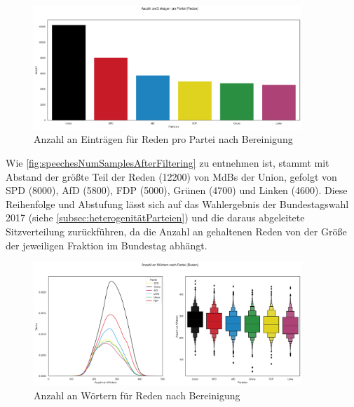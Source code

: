 \begin{figure}[H]
    \centering
    \includegraphics[width=0.9\textwidth]{data/images/speeches_num_samples_after_filter.png}
    \caption{Anzahl an Einträgen für Reden pro Partei nach Bereinigung} \label{fig:speechesNumSamplesAfterFiltering}
\end{figure}

Wie \autoref{fig:speechesNumSamplesAfterFiltering} zu entnehmen ist, stammt mit Abstand der größte Teil der Reden (\num{12200}) von \acp{MdB} der Union, gefolgt von \ac{SPD} (\num{8000}), \ac{AfD} (\num{5800}), \ac{FDP} (\num{5000}), Grünen (\num{4700}) und Linken (\num{4600}). Diese Reihenfolge und Abstufung lässt sich auf das Wahlergebnis der Bundestagswahl \num{2017} (siehe \autoref{subsec:heterogenitätParteien}) und die daraus abgeleitete Sitzverteilung zurückführen, da die Anzahl an gehaltenen Reden von der Größe der jeweiligen Fraktion im Bundestag abhängt.

\begin{figure}[H]
    \centering
    \includegraphics[width=0.9\textwidth]{data/images/speeches_word_count_after_filter.png}
    \caption{Anzahl an Wörtern für Reden nach Bereinigung} \label{fig:speechesWortCountAfterFiltering}
\end{figure}

